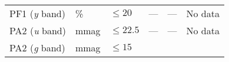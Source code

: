 \documentclass[DM,toc]{lsstdoc}
\begin{document}
\begin{longtable}[]{@{}llllll@{}}
\begin{minipage}[t]{0.14\columnwidth}\raggedright\strut
PF1 (\emph{y} band)\strut
\end{minipage} & \begin{minipage}[t]{0.06\columnwidth}\raggedright\strut
\%\strut
\end{minipage} & \begin{minipage}[t]{0.17\columnwidth}\raggedright\strut
\(\leq 20\)\strut
\end{minipage} & \begin{minipage}[t]{0.17\columnwidth}\raggedright\strut
---\strut
\end{minipage} & \begin{minipage}[t]{0.12\columnwidth}\raggedright\strut
---\strut
\end{minipage} & \begin{minipage}[t]{0.17\columnwidth}\raggedright\strut
No data\strut
\end{minipage}\tabularnewline
\begin{minipage}[t]{0.14\columnwidth}\raggedright\strut
PA2 (\emph{u} band)\strut
\end{minipage} & \begin{minipage}[t]{0.06\columnwidth}\raggedright\strut
mmag\strut
\end{minipage} & \begin{minipage}[t]{0.17\columnwidth}\raggedright\strut
\(\leq 22.5\)\strut
\end{minipage} & \begin{minipage}[t]{0.17\columnwidth}\raggedright\strut
---\strut
\end{minipage} & \begin{minipage}[t]{0.12\columnwidth}\raggedright\strut
---\strut
\end{minipage} & \begin{minipage}[t]{0.17\columnwidth}\raggedright\strut
No data\strut
\end{minipage}\tabularnewline
\begin{minipage}[t]{0.14\columnwidth}\raggedright\strut
PA2 (\emph{g} band)\strut
\end{minipage} & \begin{minipage}[t]{0.06\columnwidth}\raggedright\strut
mmag\strut
\end{minipage} & \begin{minipage}[t]{0.17\columnwidth}\raggedright\strut
\(\leq 15\)\strut
\end{minipage} & \begin{minipage}[t]{0.17\columnwidth}\raggedright\strut

\end{minipage}
\end{longtable}
\end{document}
